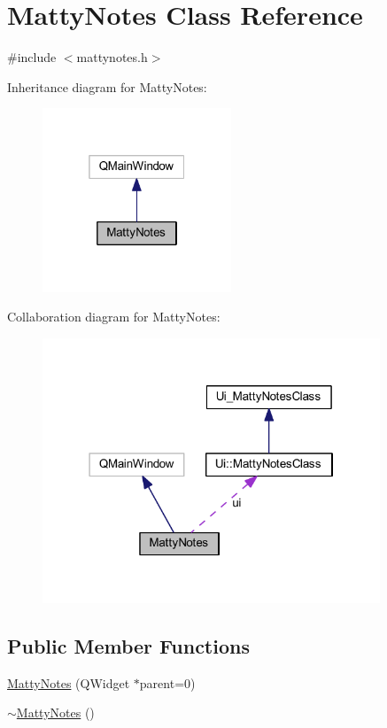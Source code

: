 \hypertarget{classMattyNotes}{}\section{Matty\+Notes Class Reference}
\label{classMattyNotes}


{\ttfamily \#include $<$mattynotes.\+h$>$}



Inheritance diagram for Matty\+Notes\+:
\nopagebreak
\begin{figure}[H]
\begin{center}
\leavevmode
\includegraphics[width=160pt]{classMattyNotes__inherit__graph}
\end{center}
\end{figure}


Collaboration diagram for Matty\+Notes\+:
\nopagebreak
\begin{figure}[H]
\begin{center}
\leavevmode
\includegraphics[width=286pt]{classMattyNotes__coll__graph}
\end{center}
\end{figure}
\subsection*{Public Member Functions}
\begin{DoxyCompactItemize}
\item 
\hyperlink{classMattyNotes_aa81db851f82183700abb0b7cd1ba2299}{Matty\+Notes} (Q\+Widget $\ast$parent=0)
\item 
\hyperlink{classMattyNotes_aff7466ee8047ed0293c62df37d245906}{$\sim$\+Matty\+Notes} ()
\end{DoxyCompactItemize}
